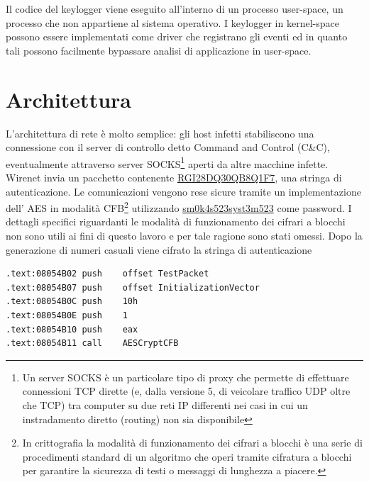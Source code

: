 \documentclass[12pt,oneside]{fithesis2}
\begin{document}
    Il codice del keylogger viene eseguito all'interno di un processo user-space, un processo che non appartiene al sistema operativo. I keylogger in kernel-space possono essere implementati come driver che registrano gli eventi ed in quanto tali possono facilmente bypassare analisi di applicazione in user-space. %
        \clearpage

        \section*{Architettura}
        L'architettura di rete è molto semplice: gli host infetti stabiliscono una connessione con il server di controllo detto Command and Control (C\&C), eventualmente attraverso server SOCKS\footnote{Un server SOCKS è un particolare tipo di proxy che permette di effettuare connessioni TCP dirette (e, dalla versione 5, di veicolare traffico UDP oltre che TCP) tra computer su due reti IP differenti nei casi in cui un instradamento diretto (routing) non sia disponibile} aperti da altre macchine infette.\newline
        Wirenet invia un pacchetto contenente \url{RGI28DQ30QB8Q1F7}, una stringa di autenticazione. Le comunicazioni vengono rese sicure tramite un implementazione dell' AES in modalità CFB\footnote{In crittografia la modalità di funzionamento dei cifrari a blocchi è una serie di procedimenti standard di un algoritmo che operi tramite cifratura a blocchi per garantire la sicurezza di testi o messaggi di lunghezza a piacere.} utilizzando \url{sm0k4s523syst3m523} come password. I dettagli specifici riguardanti le modalità di funzionamento dei cifrari a blocchi non sono utili ai fini di questo lavoro e per tale ragione sono stati omessi. Dopo la generazione di numeri casuali viene cifrato la stringa di autenticazione        \begin{verbatim}
.text:08054B02 push    offset TestPacket
.text:08054B07 push    offset InitializationVector
.text:08054B0C push    10h
.text:08054B0E push    1
.text:08054B10 push    eax
.text:08054B11 call    AESCryptCFB
        \end{verbatim}
        \clearpage
        
\end{document}
